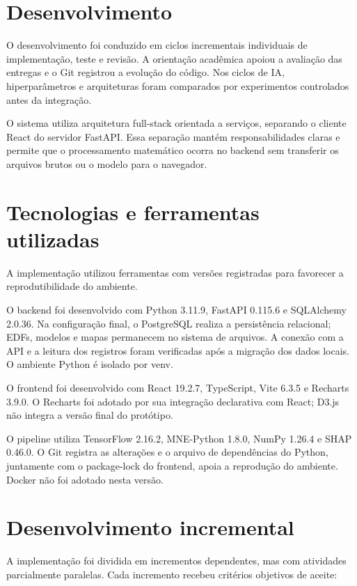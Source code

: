 \section{Desenvolvimento}
O desenvolvimento foi conduzido em ciclos incrementais individuais de implementação, teste e revisão. A orientação acadêmica apoiou a avaliação das entregas e o Git registrou a evolução do código. Nos ciclos de IA, hiperparâmetros e arquiteturas foram comparados por experimentos controlados antes da integração.

O sistema utiliza arquitetura full-stack orientada a serviços, separando o cliente React do servidor FastAPI. Essa separação mantém responsabilidades claras e permite que o processamento matemático ocorra no backend sem transferir os arquivos brutos ou o modelo para o navegador.

\section{Tecnologias e ferramentas utilizadas}
A implementação utilizou ferramentas com versões registradas para favorecer a reprodutibilidade do ambiente.

O backend foi desenvolvido com Python 3.11.9, FastAPI 0.115.6 e SQLAlchemy 2.0.36. Na configuração final, o PostgreSQL realiza a persistência relacional; EDFs, modelos e mapas permanecem no sistema de arquivos. A conexão com a API e a leitura dos registros foram verificadas após a migração dos dados locais. O ambiente Python é isolado por venv.

O frontend foi desenvolvido com React 19.2.7, TypeScript, Vite 6.3.5 e Recharts 3.9.0. O Recharts foi adotado por sua integração declarativa com React; D3.js não integra a versão final do protótipo.

O pipeline utiliza TensorFlow 2.16.2, MNE-Python 1.8.0, NumPy 1.26.4 e SHAP 0.46.0. O Git registra as alterações e o arquivo de dependências do Python, juntamente com o package-lock do frontend, apoia a reprodução do ambiente. Docker não foi adotado nesta versão.

\section{Desenvolvimento incremental}
A implementação foi dividida em incrementos dependentes, mas com atividades parcialmente paralelas. Cada incremento recebeu critérios objetivos de aceite:

